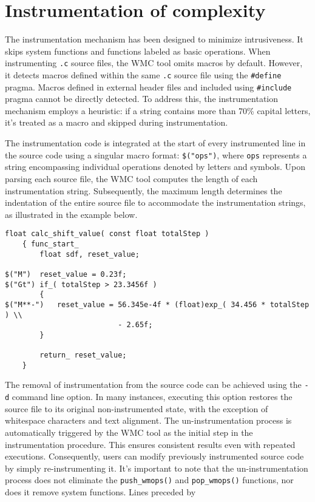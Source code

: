 \section{Instrumentation of complexity}
\label{ch:instrumentation_of_complexity}

The instrumentation mechanism has been designed to minimize intrusiveness. It skips system functions and functions labeled as basic operations. When instrumenting \verb|.c| source files, the WMC tool omits macros by default. However, it detects macros defined within the same \verb|.c| source file using the \verb|#define| pragma. Macros defined in external header files and included using \verb|#include| pragma cannot be directly detected. To address this, the instrumentation mechanism employs a heuristic: if a string contains more than 70\% capital letters, it's treated as a macro and skipped during instrumentation.

The instrumentation code is integrated at the start of every instrumented line in the source code using a singular macro format: \verb|$("ops")|, where \verb|ops| represents a string encompassing individual operations denoted by letters and symbols. Upon parsing each source file, the WMC tool computes the length of each instrumentation string. Subsequently, the maximum length determines the indentation of the entire source file to accommodate the instrumentation strings, as illustrated in the example below.

\begin{Verbatim}[fontsize=\small]
    float calc_shift_value( const float totalStep )
    { func_start_
        float sdf, reset_value;

$("M")  reset_value = 0.23f;
$("Gt") if_( totalStep > 23.3456f )
        {
$("M**-")   reset_value = 56.345e-4f * (float)exp_( 34.456 * totalStep ) \\
                          - 2.65f;
        }

        return_ reset_value;
    }
\end{Verbatim}

The removal of instrumentation from the source code can be achieved using the \verb|-d| command line option. In many instances, executing this option restores the source file to its original non-instrumented state, with the exception of whitespace characters and text alignment. The un-instrumentation process is automatically triggered by the WMC tool as the initial step in the instrumentation procedure. This ensures consistent results even with repeated executions. Consequently, users can modify previously instrumented source code by simply re-instrumenting it. It's important to note that the un-instrumentation process does not eliminate the \verb|push_wmops()| and \verb|pop_wmops()| functions, nor does it remove system functions. Lines preceded by

